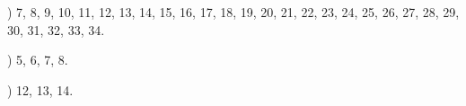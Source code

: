 \documentclass[a4paper,11pt]{article}
\begin{document}
\vspace{\spaceFour}



\noindent
{}) 7, 8, 9, 10, 11, 12, 13, 14, 15, 16, 17, 18, 19, 20,
21, 22, 23, 24, 25, 26, 27, 28, 29, 30, 31, 32, 33, 34.


\vspace{\spaceTwo}












\noindent
{}) 5, 6, 7, 8.

\vspace{\spaceFour}



\noindent
{}) 12, 13, 14.

\vspace{\spaceFour}











\end{document}

